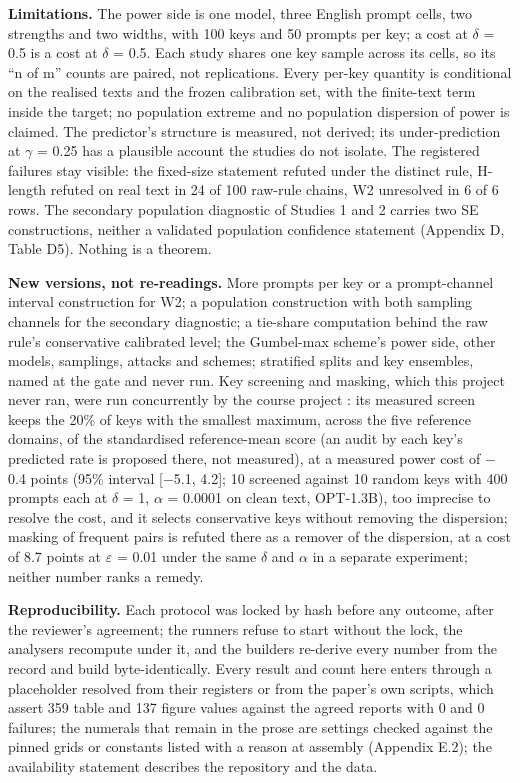 \documentclass[11pt,letterpaper]{article}
\begin{document}
\textbf{Limitations.} The power side is one model, three English prompt cells, two strengths and two widths, with 100 keys and 50 prompts per key; a cost at \ensuremath{\delta} = 0.5 is a cost at \ensuremath{\delta} = 0.5. Each study shares one key sample across its cells, so its ``n of m'' counts are paired, not replications. Every per-key quantity is conditional on the realised texts and the frozen calibration set, with the finite-text term inside the target; no population extreme and no population dispersion of power is claimed. The predictor's structure is measured, not derived; its under-prediction at \ensuremath{\gamma} = 0.25 has a plausible account the studies do not isolate. The registered failures stay visible: the fixed-size statement refuted under the distinct rule, H-length refuted on real text in 24 of 100 raw-rule chains, W2 unresolved in 6 of 6 rows. The secondary population diagnostic of Studies 1 and 2 carries two SE constructions, neither a validated population confidence statement (Appendix D, Table D5). Nothing is a theorem.

\textbf{New versions, not re-readings.} More prompts per key or a prompt-channel interval construction for W2; a population construction with both sampling channels for the secondary diagnostic; a tie-share computation behind the raw rule's conservative calibrated level; the Gumbel-max scheme's power side, other models, samplings, attacks and schemes; stratified splits and key ensembles, named at the gate and never run. Key screening and masking, which this project never ran, were run concurrently by the course project \citep{yukhimchuk2026keylottery}: its measured screen keeps the 20\% of keys with the smallest maximum, across the five reference domains, of the standardised reference-mean score (an audit by each key's predicted rate is proposed there, not measured), at a measured power cost of \ensuremath{-}0.4 points (95\% interval {[}\ensuremath{-}5.1, 4.2{]}; 10 screened against 10 random keys with 400 prompts each at \ensuremath{\delta} = 1, \ensuremath{\alpha} = 0.0001 on clean text, OPT-1.3B), too imprecise to resolve the cost, and it selects conservative keys without removing the dispersion; masking of frequent pairs is refuted there as a remover of the dispersion, at a cost of 8.7 points at \ensuremath{\varepsilon} = 0.01 under the same \ensuremath{\delta} and \ensuremath{\alpha} in a separate experiment; neither number ranks a remedy.

\textbf{Reproducibility.} Each protocol was locked by hash before any outcome, after the reviewer's agreement; the runners refuse to start without the lock, the analysers recompute under it, and the builders re-derive every number from the record and build byte-identically. Every result and count here enters through a placeholder resolved from their registers or from the paper's own scripts, which assert 359 table and 137 figure values against the agreed reports with 0 and 0 failures; the numerals that remain in the prose are settings checked against the pinned grids or constants listed with a reason at assembly (Appendix E.2); the availability statement describes the repository and the data.
\end{document}
